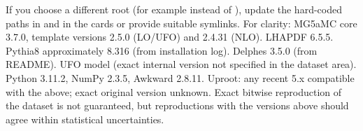 {}
\markdownRendererSectionEnd \markdownRendererSectionBegin
{}\markdownRendererInterblockSeparator
{}\markdownRendererInterblockSeparator
{}If you choose a different root (for example  instead of ), update the hard-coded paths in  and in the  cards or provide suitable symlinks.\markdownRendererInterblockSeparator
{}
\markdownRendererSectionEnd 
\markdownRendererSectionEnd \markdownRendererSectionBegin
{}\markdownRendererInterblockSeparator
{}For clarity:\markdownRendererInterblockSeparator
{}\markdownRendererUlBegin
\markdownRendererUlItem {}\markdownRendererInterblockSeparator
{}\markdownRendererUlBeginTight
\markdownRendererUlItem MG5\markdownRendererUnderscore{}aMC core 3.7.0, template versions 2.5.0 (LO/UFO) and 2.4.31 (NLO).\markdownRendererUlItemEnd 
\markdownRendererUlItem LHAPDF 6.5.5.\markdownRendererUlItemEnd 
\markdownRendererUlItem Pythia8 approximately 8.316 (from installation log).\markdownRendererUlItemEnd 
\markdownRendererUlItem Delphes 3.5.0 (from README).\markdownRendererUlItemEnd 
\markdownRendererUlItem UFO model  (exact internal version not specified in the dataset area).\markdownRendererUlItemEnd 
\markdownRendererUlEndTight \markdownRendererUlItemEnd 
\markdownRendererUlItem {}\markdownRendererInterblockSeparator
{}\markdownRendererUlBeginTight
\markdownRendererUlItem Python 3.11.2, NumPy 2.3.5, Awkward 2.8.11.\markdownRendererUlItemEnd 
\markdownRendererUlItem Uproot: any recent 5.x compatible with the above; exact original version unknown.\markdownRendererUlItemEnd 
\markdownRendererUlEndTight \markdownRendererUlItemEnd 
\markdownRendererUlEnd \markdownRendererInterblockSeparator
{}Exact bitwise reproduction of the dataset is not guaranteed, but reproductions with the versions above should agree within statistical uncertainties.\markdownRendererInterblockSeparator
{}
\markdownRendererSectionEnd 
\markdownRendererSectionEnd \markdownRendererSectionBegin
{}\markdownRendererInterblockSeparator
